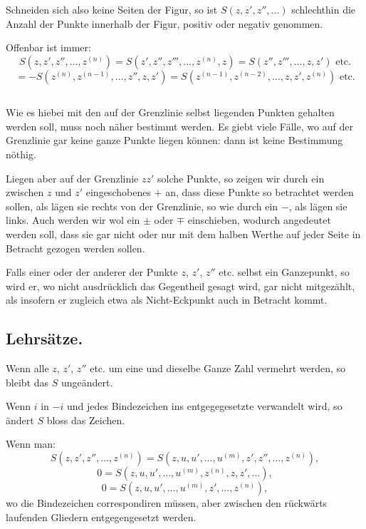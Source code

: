 \documentclass[12pt,a4paper]{article}
\begin{document}
Schneiden sich also keine Seiten der Figur, so ist $S(z, z', z'', \ldots)$ schlechthin die Anzahl der
Punkte innerhalb der Figur, positiv oder negativ genommen.

Offenbar ist immer:
\[
S(z, z', z'', \ldots, z^{(n)}) = S(z', z'', z''', \ldots, z^{(n)}, z) = S(z'', z''', \ldots, z, z') \text{ etc.}
\]
\[
= -S(z^{(n)}, z^{(n-1)}, \ldots, z'', z, z') = S(z^{(n-1)}, z^{(n-2)}, \ldots, z, z', z^{(n)}) \text{ etc.}
\]


\subsection*{}

Wie es hiebei mit den auf der Grenzlinie selbst liegenden Punkten gehalten werden soll, muss noch
näher bestimmt werden. Es giebt viele Fälle, wo auf der Grenzlinie gar keine ganze Punkte liegen
können: dann ist keine Bestimmung nöthig.

Liegen aber auf der Grenzlinie $zz'$ solche Punkte, so zeigen wir durch ein zwischen $z$ und $z'$
eingeschobenes $+$ an, dass diese Punkte so betrachtet werden sollen, als lägen sie rechts von der
Grenzlinie, so wie durch ein $-$, als lägen sie links. Auch werden wir wol ein $\pm$ oder $\mp$
einschieben, wodurch angedeutet werden soll, dass sie gar nicht oder nur mit dem halben Werthe
auf jeder Seite in Betracht gezogen werden sollen.

Falls einer oder der anderer der Punkte $z$, $z'$, $z''$ etc. selbst ein Ganzepunkt, so wird er, wo
nicht ausdrücklich das Gegentheil gesagt wird, gar nicht mitgezählt, als insofern er zugleich etwa als
Nicht-Eckpunkt auch in Betracht kommt.

\subsection*{Lehrsätze.}

Wenn alle $z$, $z'$, $z''$ etc. um eine und dieselbe Ganze Zahl vermehrt werden, so bleibt das
$S$ ungeändert.

Wenn $i$ in $-i$ und jedes Bindezeichen ins entgegegesetzte verwandelt wird, so ändert $S$
bloss das Zeichen.

Wenn man:
\[
S(z, z', z'', \ldots, z^{(n)}) = S(z, u, u', \ldots, u^{(m)}, z', z'', \ldots, z^{(n)}),
\]
\[
0 = S(z, u, u', \ldots, u^{(m)}, z^{(n)}, z, z', \ldots),
\]
\[
0 = S(z, u, u', \ldots, u^{(m)}, z', \ldots, z^{(n)}),
\]
wo die Bindezeichen correspondiren müssen, aber zwischen den rückwärts laufenden Gliedern
entgegengesetzt werden.
\end{document}
